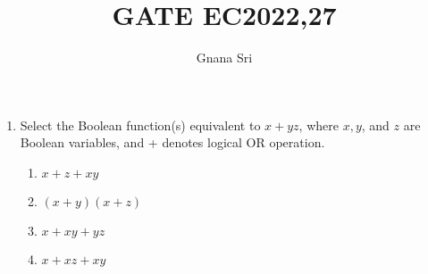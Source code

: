 \documentclass{article}
\begin{document}
\title{GATE EC2022,27}
\author{Gnana Sri}
\maketitle

\begin{enumerate}
	\item Select the Boolean function(s) equivalent to $x + yz$, where $x,y$, and $z$ are Boolean variables, and + denotes logical OR  operation.
		\begin{enumerate}[label=(\Alph*)]
			\item $x + z + {xy}$
			\item ${(x + y)}{(x + z)}$
			\item $x + {xy} + {yz}$
			\item $x + {xz} + {xy}$
		\end{enumerate}
\end{enumerate}
\end{document}
